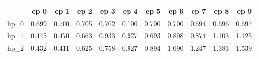 \begin{tabular}{lrrrrrrrrrr}
\toprule
{} &   ep 0 &   ep 1 &   ep 2 &   ep 3 &   ep 4 &   ep 5 &   ep 6 &   ep 7 &   ep 8 &   ep 9 \\
\midrule
hp\_0 &  0.699 &  0.700 &  0.705 &  0.702 &  0.700 &  0.700 &  0.700 &  0.694 &  0.696 &  0.697 \\
hp\_1 &  0.445 &  0.470 &  0.663 &  0.933 &  0.927 &  0.693 &  0.808 &  0.874 &  1.103 &  1.125 \\
hp\_2 &  0.432 &  0.411 &  0.625 &  0.758 &  0.927 &  0.894 &  1.090 &  1.247 &  1.383 &  1.539 \\
\bottomrule
\end{tabular}
